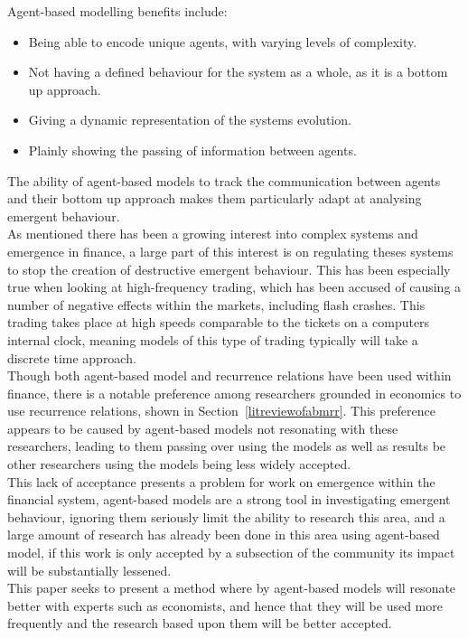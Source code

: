 \documentclass{article}
\begin{document}
Agent-based modelling benefits include:
\begin{itemize}
  \item Being able to encode unique agents, with varying levels of complexity.
  \item Not having a defined behaviour for the system as a whole, as it is a bottom up approach.
  \item Giving a dynamic representation of the systems evolution. 
  \item Plainly showing the passing of information between agents. 
\end{itemize}          
The ability of agent-based models to track the communication between agents and their bottom up approach makes them particularly adapt at analysing emergent behaviour.\\  
As mentioned there has been a growing interest into complex systems and emergence in finance, a large part of this interest is on regulating theses systems to stop the creation of destructive emergent behaviour. This has been especially true when looking at high-frequency trading, which has been accused of causing a number of negative effects within the markets, including flash crashes. This trading takes place at high speeds comparable to the tickets on a computers internal clock, meaning models of this type of trading typically will take a discrete time approach.\\
Though both agent-based model and recurrence relations have been used within finance, there is a notable preference among researchers grounded in economics to use recurrence relations, shown in Section~\ref{litreviewofabmrr}. This preference appears to be caused by agent-based models not resonating with these researchers, leading to them passing over using the models as well as results be other researchers using the models being less widely accepted.\\
This lack of acceptance presents a problem for work on emergence within the financial system, agent-based models are a strong tool in investigating emergent behaviour, ignoring them seriously limit the ability to research this area, and a large amount of research has already been done in this area using agent-based model, if this work is only accepted by a subsection of the community its impact will be substantially lessened.\\     
This paper seeks to present a method where by agent-based models will resonate better with experts such as economists, and hence that they will be used more frequently and the research based upon them will be better accepted.\\    
\end{document}
